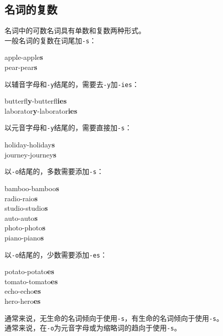 \documentclass[UTF8]{ctexart}
\begin{document}
\subsection{名词的复数}
    名词中的可数名词具有单数和复数两种形式。\\[3mm]
    一般名词的复数在词尾加\texttt{-s}：
    \begin{center}
        \ttfamily
        apple-apple\textbf{s}\\[3mm]
        pear-pear\textbf{s}\\[6mm]
    \end{center}
    以辅音字母和\texttt{-y\hspace{2pt}}结尾的，需要去\texttt{-y\hspace{2pt}}加\texttt{-ies}：
    \begin{center}
        \ttfamily
        butterfl\textbf{y}-butterfl\textbf{ies}\\[3mm]
        laborator\textbf{y}-laborator\textbf{ies}\\[6mm]
    \end{center}
    以元音字母和\texttt{-y\hspace{2pt}}结尾的，需要直接加\texttt{-s}：
    \begin{center}
        \ttfamily
        holiday-holiday\textbf{s}\\[3mm]
        journey-journey\textbf{s}\\[6mm]
    \end{center}
    以\texttt{-o\hspace{2pt}}结尾的，多数需要添加\texttt{-s}：
    \begin{center}
        \ttfamily
        bamboo-bamboo\textbf{s}\\[3mm]
        radio-raio\textbf{s}\\[3mm]
        studio-studio\textbf{s}\\[3mm]
        auto-auto\textbf{s}\\[3mm]
        photo-photo\textbf{s}\\[3mm]
        piano-piano\textbf{s}\\[6mm]
    \end{center}
    以\texttt{-o\hspace{2pt}}结尾的，少数需要添加\texttt{-es}：
    \begin{center}
        \ttfamily
        potato-potato\textbf{es}\\[3mm]
        tomato-tomato\textbf{es}\\[3mm]
        echo-echo\textbf{es}\\[3mm]
        hero-hero\textbf{es}\\[6mm]
    \end{center}
    通常来说，无生命的名词倾向于使用\texttt{-s}，有生命的名词倾向于使用\texttt{-s}。\\[3mm]
    通常来说，在\texttt{-o\hspace{2pt}}为元音字母或为缩略词的趋向于使用\texttt{-s}。
\end{document}
